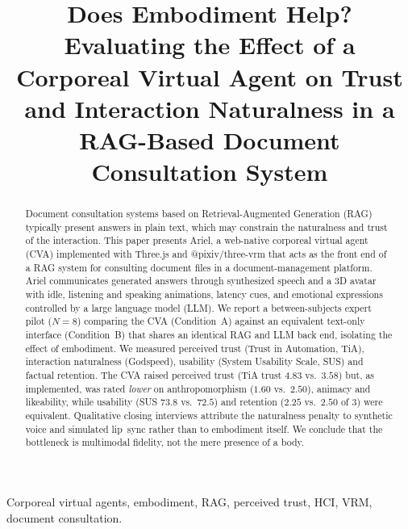 \documentclass[conference]{IEEEtran}
\begin{document}
\title{Does Embodiment Help? Evaluating the Effect of a Corporeal Virtual
Agent on Trust and Interaction Naturalness in a RAG-Based Document
Consultation System}

\author{
}

\maketitle

\begin{abstract}
Document consultation systems based on Retrieval-Augmented Generation (RAG)
typically present answers in plain text, which may constrain the naturalness
and trust of the interaction. This paper presents Ariel, a web-native
corporeal virtual agent (CVA) implemented with Three.js and @pixiv/three-vrm
that acts as the front end of a RAG system for consulting document files in a
document-management platform. Ariel communicates generated answers through
synthesized speech and a 3D avatar with idle, listening and speaking
animations, latency cues, and emotional expressions controlled by a large language model
(LLM). We report
a between-subjects expert pilot ($N=8$) comparing the CVA (Condition~A)
against an equivalent text-only interface (Condition~B) that shares an
identical RAG and LLM back end, isolating the effect of embodiment. We measured
perceived trust (Trust in Automation, TiA), interaction naturalness (Godspeed),
usability (System Usability Scale, SUS) and factual retention. The CVA raised
perceived trust (TiA trust $4.83$ vs.\ $3.58$) but, as implemented, was rated
\emph{lower} on anthropomorphism ($1.60$ vs.\ $2.50$), animacy and likeability,
while usability (SUS $73.8$ vs.\ $72.5$) and retention ($2.25$ vs.\ $2.50$ of
$3$) were equivalent. Qualitative closing interviews attribute the naturalness
penalty to synthetic voice and simulated lip~sync rather than to embodiment
itself. We conclude that the bottleneck is multimodal fidelity, not the mere
presence of a body.
\end{abstract}

\IEEEoverridecommandlockouts
\begin{keywords}
Corporeal virtual agents, embodiment, RAG, perceived trust, HCI, VRM,
document consultation.
\end{keywords}
\end{document}
